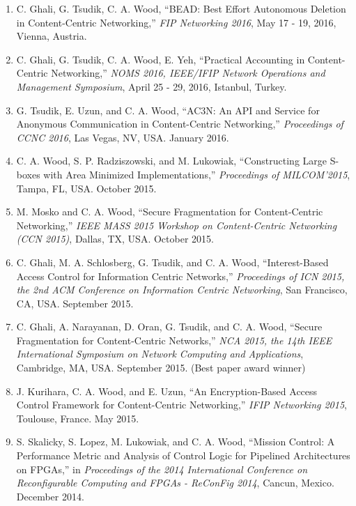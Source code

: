 \documentclass[10pt]{res} %
\begin{document}
\begin{resume}
\begin{enumerate}[C-1.]
\item C. Ghali, G. Tsudik, C. A. Wood, ``BEAD: Best Effort Autonomous Deletion in Content-Centric Networking,'' \emph{FIP Networking 2016}, May 17 - 19, 2016, Vienna, Austria.

\item C. Ghali, G. Tsudik, C. A. Wood, E. Yeh, ``Practical Accounting in Content-Centric Networking,''  \emph{NOMS 2016, IEEE/IFIP Network Operations and Management Symposium}, April 25 - 29, 2016, Istanbul, Turkey.

\item G. Tsudik, E. Uzun, and C. A. Wood, ``AC3N: An API and Service for Anonymous Communication in Content-Centric Networking,'' \emph{Proceedings of CCNC 2016}, Las Vegas, NV, USA. January 2016.

\item C. A. Wood, S. P. Radziszowski, and M. Lukowiak, ``Constructing Large S-boxes with Area Minimized Implementations,'' \emph{Proceedings of MILCOM'2015}, Tampa, FL, USA. October 2015.

\item M. Mosko and C. A. Wood, ``Secure Fragmentation for Content-Centric Networking,'' \emph{IEEE MASS 2015 Workshop on Content-Centric Networking (CCN 2015)}, Dallas, TX, USA. October 2015.

\item C. Ghali, M. A. Schlosberg, G. Tsudik, and C. A. Wood, ``Interest-Based Access Control for Information Centric Networks,'' \emph{Proceedings of ICN 2015, the 2nd ACM Conference on Information Centric Networking}, San Francisco, CA, USA. September 2015.

\item C. Ghali, A. Narayanan, D. Oran, G. Tsudik, and C. A. Wood, ``Secure Fragmentation for Content-Centric Networks,'' \emph{NCA 2015, the 14th IEEE International Symposium on Network Computing and Applications}, Cambridge, MA, USA. September 2015. {\color{red} (Best paper award winner)}

\item J. Kurihara, C. A. Wood, and E. Uzun, ``An Encryption-Based Access Control Framework for Content-Centric Networking,'' \emph{IFIP Networking 2015}, Toulouse, France. May 2015.

\item S. Skalicky, S. Lopez, M. Lukowiak, and C. A. Wood, ``Mission Control: A Performance Metric and Analysis of Control Logic for Pipelined Architectures on FPGAs,'' in {\it Proceedings of the 2014 International Conference on Reconfigurable Computing and FPGAs - ReConFig 2014}, Cancun, Mexico. December 2014.


\end{enumerate}
\end{resume}
\end{document}
